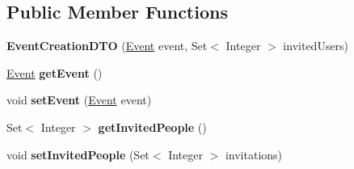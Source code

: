\subsection*{Public Member Functions}
\begin{DoxyCompactItemize}
\item 
\hypertarget{classit_1_1polimi_1_1se_1_1calcare_1_1dto_1_1EventCreationDTO_a7ee4324875e336c23f075caf06561751}{}{\bfseries Event\+Creation\+D\+T\+O} (\hyperlink{classit_1_1polimi_1_1se_1_1calcare_1_1entities_1_1Event}{Event} event, Set$<$ Integer $>$ invited\+Users)\label{classit_1_1polimi_1_1se_1_1calcare_1_1dto_1_1EventCreationDTO_a7ee4324875e336c23f075caf06561751}

\item 
\hypertarget{classit_1_1polimi_1_1se_1_1calcare_1_1dto_1_1EventCreationDTO_a6f3bcda113265f8c4a3071ffb2977681}{}\hyperlink{classit_1_1polimi_1_1se_1_1calcare_1_1entities_1_1Event}{Event} {\bfseries get\+Event} ()\label{classit_1_1polimi_1_1se_1_1calcare_1_1dto_1_1EventCreationDTO_a6f3bcda113265f8c4a3071ffb2977681}

\item 
\hypertarget{classit_1_1polimi_1_1se_1_1calcare_1_1dto_1_1EventCreationDTO_a6ae3b65ab0857992db099ee89820f0ca}{}void {\bfseries set\+Event} (\hyperlink{classit_1_1polimi_1_1se_1_1calcare_1_1entities_1_1Event}{Event} event)\label{classit_1_1polimi_1_1se_1_1calcare_1_1dto_1_1EventCreationDTO_a6ae3b65ab0857992db099ee89820f0ca}

\item 
\hypertarget{classit_1_1polimi_1_1se_1_1calcare_1_1dto_1_1EventCreationDTO_ad9b1f369ad67162a728aa3a9ccd38ea0}{}Set$<$ Integer $>$ {\bfseries get\+Invited\+People} ()\label{classit_1_1polimi_1_1se_1_1calcare_1_1dto_1_1EventCreationDTO_ad9b1f369ad67162a728aa3a9ccd38ea0}

\item 
\hypertarget{classit_1_1polimi_1_1se_1_1calcare_1_1dto_1_1EventCreationDTO_a91571aa5f0ab2bd3caa347f4bf3b3e14}{}void {\bfseries set\+Invited\+People} (Set$<$ Integer $>$ invitations)\label{classit_1_1polimi_1_1se_1_1calcare_1_1dto_1_1EventCreationDTO_a91571aa5f0ab2bd3caa347f4bf3b3e14}

\end{DoxyCompactItemize}

